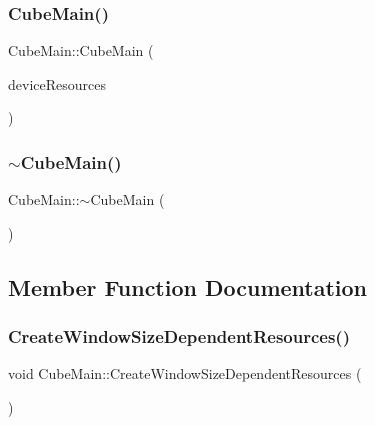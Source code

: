 \subsubsection{\texorpdfstring{Cube\+Main()}{CubeMain()}}
{\footnotesize\ttfamily Cube\+Main\+::\+Cube\+Main (\begin{DoxyParamCaption}\item[{const std\+::shared\+\_\+ptr$<$ \hyperlink{class_d_x_1_1_device_resources}{D\+X\+::\+Device\+Resources} $>$ \&}]{device\+Resources }\end{DoxyParamCaption})}

\mbox{\label{class_cube_1_1_cube_main_a81cc083beb265cb02e8ff2e6d7448cf0}} 
\subsubsection{\texorpdfstring{$\sim$\+Cube\+Main()}{~CubeMain()}}
{\footnotesize\ttfamily Cube\+Main\+::$\sim$\+Cube\+Main (\begin{DoxyParamCaption}{ }\end{DoxyParamCaption})}



\subsection{Member Function Documentation}
\mbox{\label{class_cube_1_1_cube_main_a584b21871de3599456d0ae51b8b1f720}} 
\subsubsection{\texorpdfstring{Create\+Window\+Size\+Dependent\+Resources()}{CreateWindowSizeDependentResources()}}
{\footnotesize\ttfamily void Cube\+Main\+::\+Create\+Window\+Size\+Dependent\+Resources (\begin{DoxyParamCaption}{ }\end{DoxyParamCaption})}

